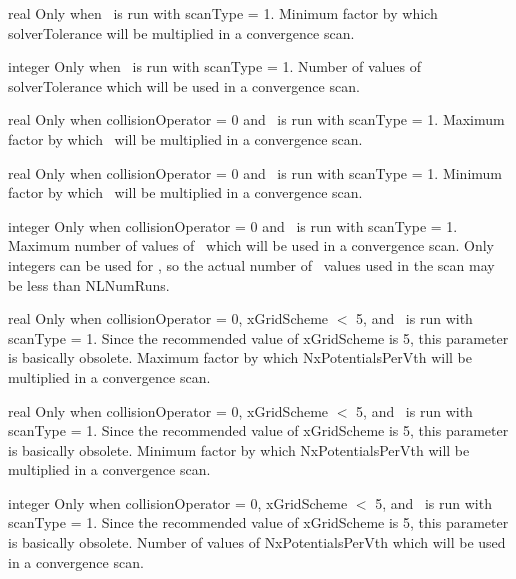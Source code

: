 \myhrule

{real}
{Only when \sfincsScan~is run with {\ttfamily scanType} = 1.}
{Minimum factor by which {\ttfamily solverTolerance} will be multiplied in a convergence scan.}

\myhrule

{integer}
{Only when \sfincsScan~is run with {\ttfamily scanType} = 1.}
{Number of values of {\ttfamily solverTolerance} which will be used in a convergence scan.}

\myhrule

{real}
{Only when {\ttfamily collisionOperator} = 0 and \sfincsScan~is run with {\ttfamily scanType} = 1.}
{Maximum factor by which \NL~will be multiplied in a convergence scan.}

\myhrule

{real}
{Only when {\ttfamily collisionOperator} = 0 and \sfincsScan~is run with {\ttfamily scanType} = 1.}
{Minimum factor by which \NL~will be multiplied in a convergence scan.}

\myhrule

{integer}
{Only when {\ttfamily collisionOperator} = 0 and \sfincsScan~is run with {\ttfamily scanType} = 1.}
{Maximum number of values of \NL~which will be used in a convergence scan.  Only integers can be used
for \NL, so the actual number of \NL~values used in the scan may be less than {\ttfamily NLNumRuns}.}

\myhrule

{real}
{Only when {\ttfamily collisionOperator} = 0, {\ttfamily xGridScheme} $<$ 5, and \sfincsScan~is run with {\ttfamily scanType} = 1.
Since the recommended value of {\ttfamily xGridScheme} is 5, this parameter is basically obsolete.}
{Maximum factor by which {\ttfamily NxPotentialsPerVth} will be multiplied in a convergence scan.}

\myhrule

{real}
{Only when {\ttfamily collisionOperator} = 0, {\ttfamily xGridScheme} $<$ 5, and \sfincsScan~is run with {\ttfamily scanType} = 1.
Since the recommended value of {\ttfamily xGridScheme} is 5, this parameter is basically obsolete.}
{Minimum factor by which {\ttfamily NxPotentialsPerVth} will be multiplied in a convergence scan.}

\myhrule

{integer}
{Only when {\ttfamily collisionOperator} = 0, {\ttfamily xGridScheme} $<$ 5, and \sfincsScan~is run with {\ttfamily scanType} = 1.
Since the recommended value of {\ttfamily xGridScheme} is 5, this parameter is basically obsolete.}
{Number of values of {\ttfamily NxPotentialsPerVth} which will be used in a convergence scan.}

